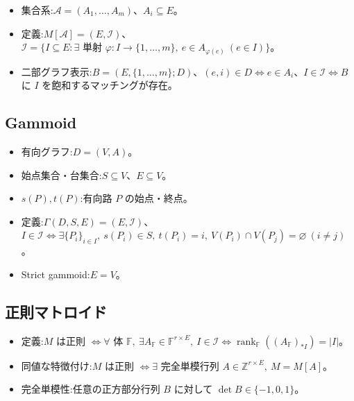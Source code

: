 \documentclass[a4paper, 11pt, dvipdfmx]{jsarticle}
\theoremstyle{definition}
\begin{document}
\begin{itemize}
  \item 集合系:$\mathcal{A} = (A_1, \ldots, A_m)$、$A_i \subseteq E$。
  \item 定義:$M[\mathcal{A}] = (E, \mathcal{I})$、$\mathcal{I} = \{I \subseteq E : \exists \text{ 単射 } \varphi \colon I \to \{1, \ldots, m\},\ e \in A_{\varphi(e)}\ (e \in I)\}$。
  \item 二部グラフ表示:$B = (E, \{1, \ldots, m\}; D)$、$(e, i) \in D \Longleftrightarrow e \in A_i$、$I \in \mathcal{I} \Longleftrightarrow B$ に $I$ を飽和するマッチングが存在。
\end{itemize}

\subsection[Gammoid]{Gammoid~\citep{s6}}
\label{sec:gammoid}

\begin{itemize}
  \item 有向グラフ:$D = (V, A)$。
  \item 始点集合・台集合:$S \subseteq V$、$E \subseteq V$。
  \item $s(P),t(P)$:有向路 $P$ の始点・終点。
  \item 定義:$\Gamma(D, S, E) = (E, \mathcal{I})$、$I \in \mathcal{I} \Longleftrightarrow \exists \{P_i\}_{i \in I},\ s(P_i) \in S,\ t(P_i) = i,\ V(P_i) \cap V(P_j) = \varnothing\ (i \neq j)$。
  \item Strict gammoid:$E = V$。
\end{itemize}

\subsection[正則マトロイド]{正則マトロイド~\citep{s7}}
\label{sec:regular-matroid}

\begin{itemize}
  \item 定義:$M$ は正則 $\Longleftrightarrow \forall \text{ 体 } \mathbb{F},\ \exists A_{\mathbb{F}} \in \mathbb{F}^{r \times E},\ I \in \mathcal{I} \Longleftrightarrow \operatorname{rank}_{\mathbb{F}}((A_{\mathbb{F}})_{\ast I}) = \lvert I \rvert$。
  \item 同値な特徴付け:$M$ は正則 $\Longleftrightarrow \exists \text{ 完全単模行列 } A \in \mathbb{Z}^{r \times E},\ M = M[A]$。
  \item 完全単模性:任意の正方部分行列 $B$ に対して $\det B \in \{-1, 0, 1\}$。
\end{itemize}
\end{document}

